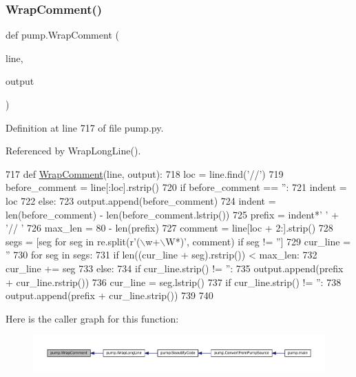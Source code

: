 \subsubsection{\texorpdfstring{Wrap\+Comment()}{WrapComment()}}
{\footnotesize\ttfamily def pump.\+Wrap\+Comment (\begin{DoxyParamCaption}\item[{}]{line,  }\item[{}]{output }\end{DoxyParamCaption})}



Definition at line 717 of file pump.\+py.



Referenced by Wrap\+Long\+Line().


\begin{DoxyCode}
717 \textcolor{keyword}{def }\hyperlink{namespacepump_a73951c98652038351b1cd24291433e12}{WrapComment}(line, output):
718   loc = line.find(\textcolor{stringliteral}{'//'})
719   before\_comment = line[:loc].rstrip()
720   \textcolor{keywordflow}{if} before\_comment == \textcolor{stringliteral}{''}:
721     indent = loc
722   \textcolor{keywordflow}{else}:
723     output.append(before\_comment)
724     indent = len(before\_comment) - len(before\_comment.lstrip())
725   prefix = indent*\textcolor{stringliteral}{' '} + \textcolor{stringliteral}{'// '}
726   max\_len = 80 - len(prefix)
727   comment = line[loc + 2:].strip()
728   segs = [seg \textcolor{keywordflow}{for} seg \textcolor{keywordflow}{in} re.split(\textcolor{stringliteral}{r'(\(\backslash\)w+\(\backslash\)W*)'}, comment) \textcolor{keywordflow}{if} seg != \textcolor{stringliteral}{''}]
729   cur\_line = \textcolor{stringliteral}{''}
730   \textcolor{keywordflow}{for} seg \textcolor{keywordflow}{in} segs:
731     \textcolor{keywordflow}{if} len((cur\_line + seg).rstrip()) < max\_len:
732       cur\_line += seg
733     \textcolor{keywordflow}{else}:
734       \textcolor{keywordflow}{if} cur\_line.strip() != \textcolor{stringliteral}{''}:
735         output.append(prefix + cur\_line.rstrip())
736       cur\_line = seg.lstrip()
737   \textcolor{keywordflow}{if} cur\_line.strip() != \textcolor{stringliteral}{''}:
738     output.append(prefix + cur\_line.strip())
739 
740 
\end{DoxyCode}
Here is the caller graph for this function\+:
\nopagebreak
\begin{figure}[H]
\begin{center}
\leavevmode
\includegraphics[width=350pt]{namespacepump_a73951c98652038351b1cd24291433e12_icgraph}
\end{center}
\end{figure}
\mbox{\label{namespacepump_a02427e2ddc80f0f408e27dfc3e38e702}} 
